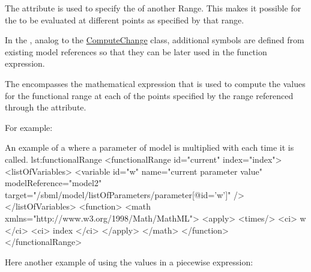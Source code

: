 The attribute  is used to specify the  of another Range. This makes it possible for the  to be evaluated at different points as specified by that range.

In the , analog to the \hyperref[class:computeChange]{ComputeChange} class,  additional symbols are defined from existing model references so that they can be later used in the function expression. 

The  encompasses the mathematical expression that is used to compute the values for the functional range at each of the points specified by the range referenced through the  attribute. 

For example:

\begin{myXmlLst}{An example of a  where a parameter  of model  is multiplied with  each time it is called. }{lst:functionalRange}
    <functionalRange id="current" index="index"> 
      <listOfVariables> 
         <variable id="w" name="current parameter value"   
				                  modelReference="model2"
                          target="/sbml/model/listOfParameters/parameter[@id='w']" /> 
      </listOfVariables> 
      <function>
        <math xmlns="http://www.w3.org/1998/Math/MathML"> 
           <apply>
           <times/>
           <ci> w </ci> 
           <ci> index </ci> 
           </apply>
        </math>  
      </function>
    </functionalRange> 
\end{myXmlLst}

Here another example of using the values in a piecewise expression: 

